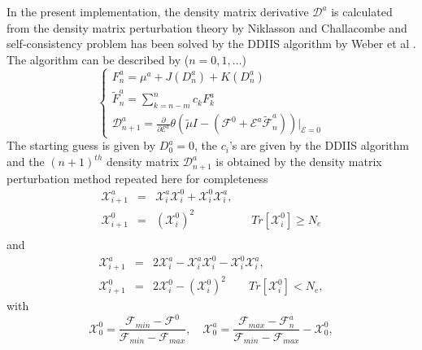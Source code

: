 \documentclass[twocolumn,showpacs,preprintnumbers,amsmath,amssymb]{revtex4}
\begin{document}
 In the present implementation, the density matrix derivative
 $\mathcal{D}^a$ is calculated from the density 
 matrix perturbation theory by Niklasson and Challacombe
 \cite{Anders} and self-consistency problem
 has been solved by the DDIIS algorithm by 
 Weber et al \cite{Weber_2003}.
 The algorithm can be described by ($n=0,1,\ldots$)
 \begin{equation}\label{alg}
   \left\{ \begin{array}{lll}
     F^a_{n}=\mu^a+J(D^a_n)+K(D^a_n) \\
     \displaystyle\widetilde{F}^a_{n}=\sum_{k=n-m}^{n}c_k F^a_{k}\\
     \displaystyle\mathcal{D}^a_{n+1}=\frac{\partial}{\partial \mathcal{E}^a}
     \theta(\tilde{\mu}I-(\mathcal{F}^{0}
     +\mathcal{E}^{a}\widetilde{\mathcal{F}}^{a}_n))
     \bigg|_{\mathcal{E}=0}
   \end{array} \right.
 \end{equation}
 The starting guess is given by $D^a_0=0$, the $c_i$'s are given
 by the DDIIS algorithm \cite{Weber_2003} and the $(n+1)^{th}$
 density matrix $\mathcal{D}^a_{n+1}$ is obtained by 
 the density matrix perturbation method \cite{Anders}
 repeated here for completeness
\begin{eqnarray}
  \mathcal{X}^a_{i+1}&=&
          \mathcal{X}^a_{i}\mathcal{X}^0_{i}+\mathcal{X}^0_{i}\mathcal{X}^a_{i},\\
  \mathcal{X}^0_{i+1}&=&(\mathcal{X}^0_{i})^2
          \qquad\qquad\quad Tr[\mathcal{X}^0_{i}]\ge N_e \\
\end{eqnarray}
and
\begin{eqnarray}
  \mathcal{X}^a_{i+1}&=&2\mathcal{X}^a_{i}-\mathcal{X}^a_{i}\mathcal{X}^0_{i}
          -\mathcal{X}^0_{i}\mathcal{X}^a_{i},\\
  \mathcal{X}^0_{i+1}&=&2\mathcal{X}^0_{i}-(\mathcal{X}^0_{i})^2
          \qquad Tr[\mathcal{X}^0_{i}]< N_e,
\end{eqnarray}
 with
 \begin{equation}
  \mathcal{X}^0_{0}=\frac{\mathcal{F}_{min}-\mathcal{F}^0}
               {\mathcal{F}_{min}-\mathcal{F}_{max}},
  \quad
  \mathcal{X}^a_{0}=\frac{\mathcal{F}_{max}-\mathcal{F}^a_{n}}
               {\mathcal{F}_{min}-\mathcal{F}_{max}}-\mathcal{X}^0_{0},
 \end{equation}
\end{document}
